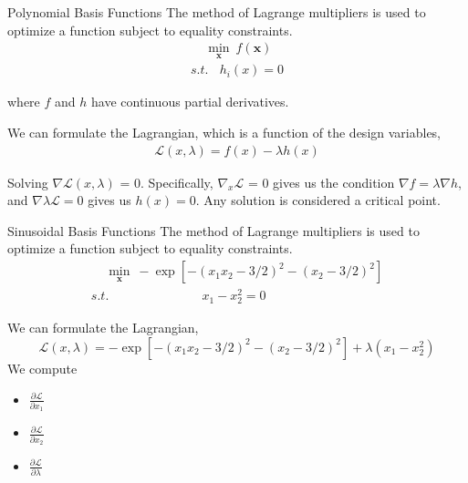 \documentclass{beamer}
\begin{document}
\begin{frame}{Polynomial Basis Functions}
The method of Lagrange multipliers is used to optimize a function subject to equality
constraints. 
\begin{gather*}
    ~~~~~ \underset{\boldsymbol{x}}{\min} ~ f(\boldsymbol{x})\\
    {s.t.}~~~~ h_i(x) = 0 
\end{gather*}

where $f$ and $h$ have continuous partial derivatives.

We can formulate the Lagrangian, which is a function of the design variables,
\begin{gather*}
    \mathcal{L}(x, \lambda) = f(x) - \lambda h(x) 
\end{gather*}

Solving $\nabla \mathcal{L}(x, \lambda)$ = 0. Specifically, $\nabla_x \mathcal{L}$ = 0 gives us the condition $\nabla f= \lambda \nabla h$, and $\nabla \lambda \mathcal{L}=0$ gives us $h(x)=0$. Any solution is considered a critical point.

\end{frame}

\begin{frame}{Sinusoidal Basis Functions}
The method of Lagrange multipliers is used to optimize a function subject to equality
constraints. 
\begin{gather*}
    ~~~~~ \underset{\boldsymbol{x}}{\min} ~ -\exp[-(x_1x_2-3/2)^2 - (x_2-3/2)^2] \\
    {s.t.}~~~~~~~~~~~~~~~~~~~~~~~~~~~~~~~~~ x_1 - x_2^2 = 0 
\end{gather*}

We can formulate the Lagrangian, 
\begin{equation*}
    \mathcal{L}(x, \lambda) = -\exp[-(x_1x_2-3/2)^2 - (x_2-3/2)^2] + \lambda(x_1 - x_2^2)
\end{equation*}
We compute
\begin{itemize}
    \item $\frac{\partial \mathcal{L}}{\partial x_1}$
    \item $\frac{\partial \mathcal{L}}{\partial x_2}$
    \item $\frac{\partial \mathcal{L}}{\partial \lambda}$
\end{itemize}

\end{frame}
\end{document}
